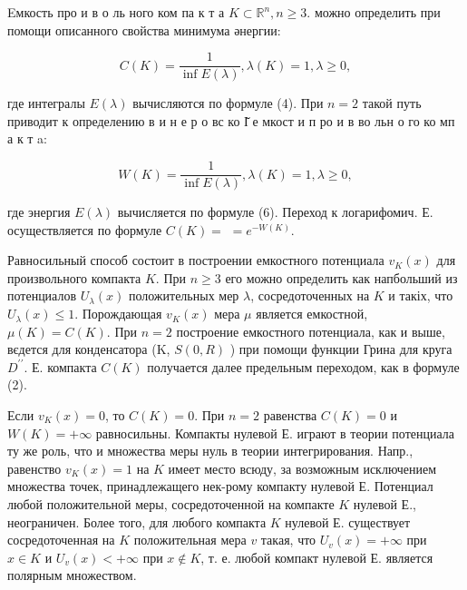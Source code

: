 \documentclass[10pt]{article}
\begin{document}
Eмкость про и в о ль ного ком па к т а $K \subset \mathbb{R}^{n}, n \geqslant 3$. можно определить при помощи описанного свойства минимума әнергии:



\[

C(K)=\frac{1}{\inf E(\lambda)}, \lambda(K)=1, \lambda \geqslant 0,

\]



где интегралы $E(\lambda)$ вычисляются по формуле (4). При $n=2$ такой путь приводит к определению в и н е р о вс ко І̆ е мкост и п ро и в во льн о го ко мп а к т a:



\[

W(K)=\frac{1}{\inf E(\lambda)}, \lambda(K)=1, \lambda \geqslant 0,

\]



где энергия $E(\lambda)$ вычисляется по формуле (6). Переход к логарифомич. Е. осуществляется по формуле $C(K)=$ $=e^{-W(K)}$.



Равносильный способ состоит в построении емкостного потенциала $v_{K}(x)$ для произвольного компакта $K$. При $n \geqslant 3$ его можно определить как напбольший из потенциалов $U_{\lambda}(x)$ положительных мер $\lambda$, сосредоточенных на $K$ и такіх, что $U_{\lambda}(x) \leqslant 1$. Порождающая $v_{K}(x)$ мера $\mu$ является емкостной, $\mu(K)=C(K)$. При $n=2$ построение емкостного потенциала, как и выше, вєдется для конденсатора (K, $S(0, R)$ ) при помощи функции Грина для круга $D^{\prime \prime}$. Е. компакта $C(K)$ получается далее предельным переходом, как в формуле (2).



Если $v_{K}(x)=0$, то $C(K)=0$. При $n=2$ равенства $C(K)=0$ и $W(K)=+\infty$ равносильны. Компакты нулевой Е. играют в теории потенциала ту же роль, что и множества меры нуль в теории интегрирования. Напр., равенство $v_{K}(x)=1$ на $K$ имеет место всюду, за возможным исключением множества точек, принадлежащего нек-рому компакту нулевой Е. Потенциал любой положительной меры, сосредоточенной на компакте $K$ нулевой Е., неограничен. Более того, для любого компакта $K$ нулевой Е. существует сосредоточенная на $K$ положительная мера $v$ такая, что $U_{v}(x)=+\infty$ при $x \in K$ и $U_{v}(x)<+\infty$ при $x \notin K$, т. е. любой компакт нулевой Е. является полярным множеством.
\end{document}
